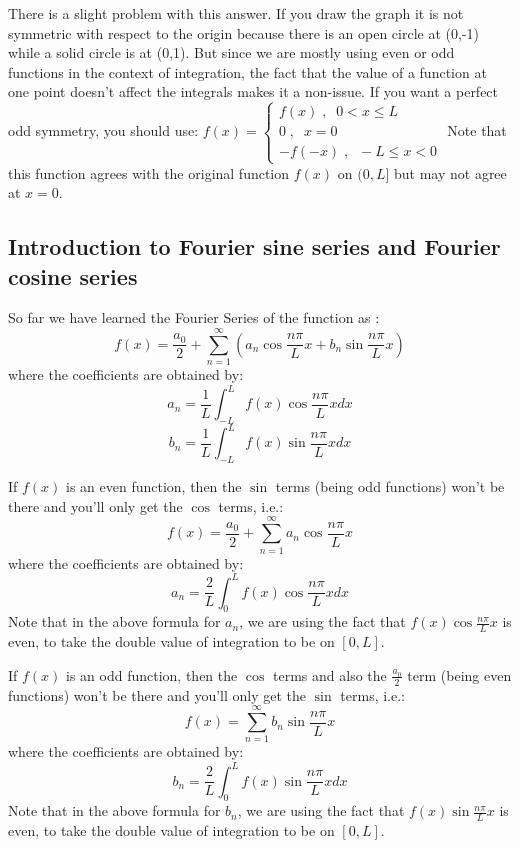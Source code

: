 \documentclass[12pt]{report}
\begin{document}
There is a slight problem with this answer. If you draw the graph it is not symmetric with respect to the origin because there is an open circle at (0,-1) while a solid circle is at (0,1). But since we are mostly using even or odd functions in the context of integration, the fact that the value of a function at one point doesn't affect the integrals makes it a non-issue. If you want a perfect odd symmetry, you should use:
$f(x) = \begin{cases} f(x)  \; , \; \;  0< x\leq L \\ 0 \; , \; \; x=0 \\ -f(-x)  \; , \; \; -L \leq x < 0 \end{cases} $
Note that this function agrees with the original function $f(x)$ on $(0, L]$ but may not agree at $x=0$.



\subsection*{Introduction to Fourier sine series and Fourier cosine series}

So far we have learned the Fourier Series of the function as :
$$f(x) = \frac{a_0}{2} + \sum_{n=1}^{\infty} \left( a_n \cos \frac{n\pi}{L} x + b_n \sin \frac{n\pi}{L} x \right) $$
where the coefficients are obtained by:
$$a_n = \frac{1}{L} \int_{-L}^{L} f(x) \cos \frac{n\pi}{L} x dx$$
$$b_n = \frac{1}{L} \int_{-L}^{L} f(x) \sin \frac{n\pi}{L} x dx$$

If $f(x)$ is an even function, then the $\sin$ terms (being odd functions) won't be there and you'll only get the $\cos$ terms, i.e.:
$$f(x) = \frac{a_0}{2} + \sum_{n=1}^{\infty}  a_n \cos \frac{n\pi}{L} x  $$
where the coefficients are obtained by:
$$a_n = \frac{2}{L} \int_{0}^{L} f(x) \cos \frac{n\pi}{L} x dx$$
Note that in the above formula for $a_n$, we are using the fact that $f(x)\cos \frac{n\pi}{L} x$ is even, to take the double value of integration to be on $[0,L]$.

If $f(x)$ is an odd function, then the $\cos$ terms and also the $\frac{a_0}{2}$ term (being even functions) won't be there and you'll only get the $\sin$ terms, i.e.:
$$f(x) = \sum_{n=1}^{\infty}  b_n \sin \frac{n\pi}{L} x  $$
where the coefficients are obtained by:
$$b_n = \frac{2}{L} \int_{0}^{L} f(x) \sin \frac{n\pi}{L} x dx$$
Note that in the above formula for $b_n$, we are using the fact that $f(x)\sin \frac{n\pi}{L} x$ is even, to take the double value of integration to be on $[0,L]$.
\end{document}
